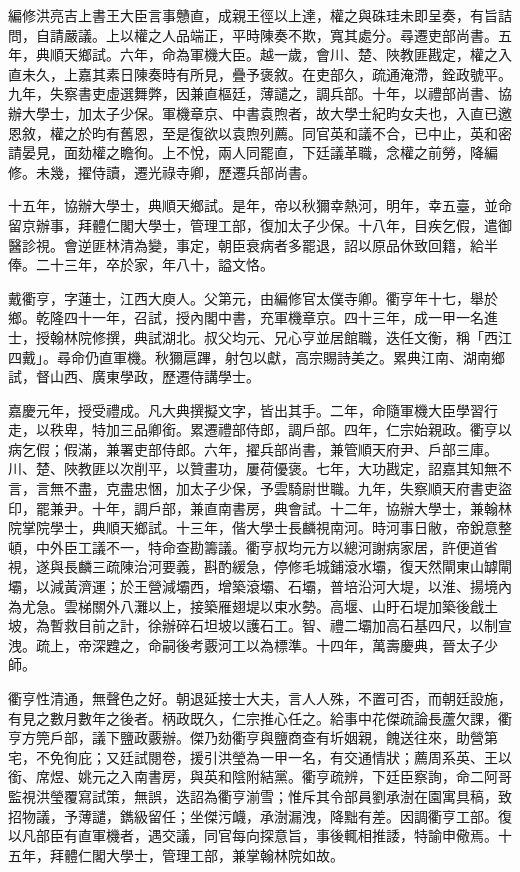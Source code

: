 \begin{pinyinscope}
編修洪亮吉上書王大臣言事戇直，成親王徑以上達，權之與硃珪未即呈奏，有旨詰問，自請嚴議。上以權之人品端正，平時陳奏不欺，寬其處分。尋遷吏部尚書。五年，典順天鄉試。六年，命為軍機大臣。越一歲，會川、楚、陜教匪戡定，權之入直未久，上嘉其素日陳奏時有所見，疊予褒敘。在吏部久，疏通淹滯，銓政號平。九年，失察書吏虛選舞弊，因兼直樞廷，薄譴之，調兵部。十年，以禮部尚書、協辦大學士，加太子少保。軍機章京、中書袁煦者，故大學士紀昀女夫也，入直已邀恩敘，權之於昀有舊恩，至是復欲以袁煦列薦。同官英和議不合，已中止，英和密請晏見，面劾權之瞻徇。上不悅，兩人同罷直，下廷議革職，念權之前勞，降編修。未幾，擢侍讀，遷光祿寺卿，歷遷兵部尚書。

十五年，協辦大學士，典順天鄉試。是年，帝以秋獮幸熱河，明年，幸五臺，並命留京辦事，拜體仁閣大學士，管理工部，復加太子少保。十八年，目疾乞假，遣御醫診視。會逆匪林清為變，事定，朝臣衰病者多罷退，詔以原品休致回籍，給半俸。二十三年，卒於家，年八十，謚文恪。

戴衢亨，字蓮士，江西大庾人。父第元，由編修官太僕寺卿。衢亨年十七，舉於鄉。乾隆四十一年，召試，授內閣中書，充軍機章京。四十三年，成一甲一名進士，授翰林院修撰，典試湖北。叔父均元、兄心亨並居館職，迭任文衡，稱「西江四戴」。尋命仍直軍機。秋獮扈蹕，射包以獻，高宗賜詩美之。累典江南、湖南鄉試，督山西、廣東學政，歷遷侍講學士。

嘉慶元年，授受禮成。凡大典撰擬文字，皆出其手。二年，命隨軍機大臣學習行走，以秩卑，特加三品卿銜。累遷禮部侍郎，調戶部。四年，仁宗始親政。衢亨以病乞假；假滿，兼署吏部侍郎。六年，擢兵部尚書，兼管順天府尹、戶部三庫。川、楚、陜教匪以次削平，以贊畫功，屢荷優褒。七年，大功戡定，詔嘉其知無不言，言無不盡，克盡忠悃，加太子少保，予雲騎尉世職。九年，失察順天府書吏盜印，罷兼尹。十年，調戶部，兼直南書房，典會試。十二年，協辦大學士，兼翰林院掌院學士，典順天鄉試。十三年，偕大學士長麟視南河。時河事日敝，帝銳意整頓，中外臣工議不一，特命查勘籌議。衢亨叔均元方以總河謝病家居，許便道省視，遂與長麟三疏陳治河要義，斟酌緩急，停修毛城鋪滾水壩，復天然閘東山罅閘壩，以減黃濟運；於王營減壩西，增築滾壩、石壩，普培沿河大堤，以淮、揚境內為尤急。雲梯關外八灘以上，接築雁翅堤以束水勢。高堰、山盱石堤加築後戧土坡，為暫救目前之計，徐辦碎石坦坡以護石工。智、禮二壩加高石基四尺，以制宣洩。疏上，帝深韙之，命嗣後考覈河工以為標準。十四年，萬壽慶典，晉太子少師。

衢亨性清通，無聲色之好。朝退延接士大夫，言人人殊，不置可否，而朝廷設施，有見之數月數年之後者。柄政既久，仁宗推心任之。給事中花傑疏論長蘆欠課，衢亨方筦戶部，議下鹽政覈辦。傑乃劾衢亨與鹽商查有圻姻親，餽送往來，助營第宅，不免徇庇；又廷試閱卷，援引洪瑩為一甲一名，有交通情狀；薦周系英、王以銜、席煜、姚元之入南書房，與英和陰附結黨。衢亨疏辨，下廷臣察詢，命二阿哥監視洪瑩覆寫試策，無誤，迭詔為衢亨湔雪；惟斥其令部員劉承澍在園寓具稿，致招物議，予薄譴，鐫級留任；坐傑污衊，承澍漏洩，降黜有差。因調衢亨工部。復以凡部臣有直軍機者，遇交議，同官每向探意旨，事後輒相推諉，特諭申儆焉。十五年，拜體仁閣大學士，管理工部，兼掌翰林院如故。


\end{pinyinscope}
